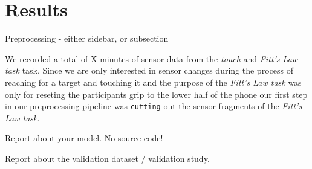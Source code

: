 \section{Results}


\begin{sidebar}
	\caption*{Preprocessing - either sidebar, or subsection}
	
	We recorded a total of X minutes of sensor data from the \textit{touch} and \textit{Fitt's Law task} task. Since we are only interested in sensor changes during the process of reaching for a target and touching it and the purpose of the \textit{Fitt's Law task} was only for reseting the participants grip to the lower half of the phone our first step in our preprocessing pipeline was \texttt{cutting} out the sensor fragments of the \textit{Fitt's Law task}.
	\label{sec:prepro}
\end{sidebar}

Report about your model. No source code!

Report about the validation dataset / validation study. 